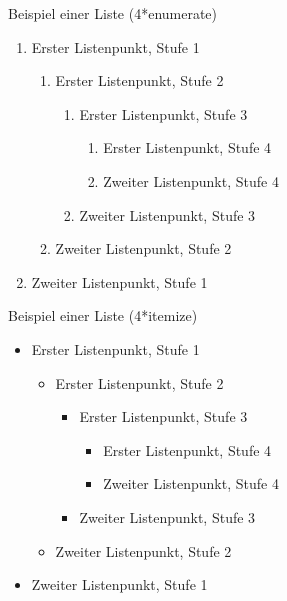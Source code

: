 \documentclass[%
,full
,color
,Ausgabe=4
]{dtk2}
\begin{document}
\maketitle

Beispiel einer Liste (4*enumerate)

\begin{enumerate}
  \item Erster Listenpunkt, Stufe 1
  \begin{enumerate}
    \item Erster Listenpunkt, Stufe 2
    \begin{enumerate}
      \item Erster Listenpunkt, Stufe 3
      \begin{enumerate}
        \item Erster Listenpunkt, Stufe 4
        \item Zweiter Listenpunkt, Stufe 4
      \end{enumerate}
      \item Zweiter Listenpunkt, Stufe 3
    \end{enumerate}
    \item Zweiter Listenpunkt, Stufe 2
  \end{enumerate}
  \item Zweiter Listenpunkt, Stufe 1
\end{enumerate}

Beispiel einer Liste (4*itemize)

\begin{itemize}
  \item Erster Listenpunkt, Stufe 1
  \begin{itemize}
    \item Erster Listenpunkt, Stufe 2
    \begin{itemize}
      \item Erster Listenpunkt, Stufe 3
      \begin{itemize}
        \item Erster Listenpunkt, Stufe 4
        \item Zweiter Listenpunkt, Stufe 4
      \end{itemize}
      \item Zweiter Listenpunkt, Stufe 3
    \end{itemize}
    \item Zweiter Listenpunkt, Stufe 2
  \end{itemize}
  \item Zweiter Listenpunkt, Stufe 1
\end{itemize}
\end{document}
